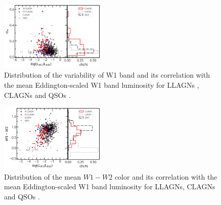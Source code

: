 \documentclass[linenumbers]{aastex631}
\begin{document}
\begin{figure}
\centering
	\includegraphics[width=0.45\textwidth]{WISE_var_LW1_Ledd_hist.png}
    \caption{Distribution of the variability of W1 band and its correlation with the mean Eddington-scaled W1 band luminosity for LLAGNs \citep{2009MNRAS.399..349G}, CLAGNs and QSOs \citep{2007ApJ...667..131G}. }
    \label{fig:var_ledd_hist}
\end{figure}


\begin{figure}
\centering
	\includegraphics[width=0.45\textwidth]{pic/WISE_W1-W2_LW1_Ledd_hist.png}
    \caption{Distribution of the mean $W1-W2$ color and its correlation with the mean Eddington-scaled W1 band luminosity for LLAGNs\citep{2009MNRAS.399..349G}, CLAGNs and QSOs \citep{2007ApJ...667..131G}. }
    \label{fig:color_ledd}
\end{figure}
\end{document}
